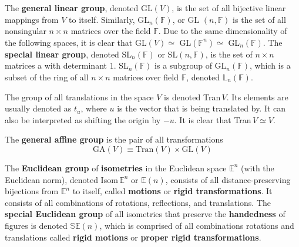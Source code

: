 \documentclass{article}
\begin{document}
  \begin{definition}
    The \textbf{general linear group}, denoted GL$(V)$, is the set of all bijective linear mappings from $V$ to itself. Similarly, GL$_{n}(\mathbb{F})$, or GL $(n, \mathbb{F})$ is the set of all nonsingular $n \times n$ matrices over the field $\mathbb{F}$. Due to the same dimensionality of the following spaces, it is clear that GL$(V) \simeq$ GL$(\mathbb{F}^{n}) \simeq$ GL$_{n}(\mathbb{F})$. The \textbf{special linear group}, denoted SL$_{n} (\mathbb{F})$ or SL$(n, \mathbb{F})$, is the set of $n\times n$ matrices a with determinant $1$. SL$_{n}(\mathbb{F})$ is a subgroup of GL$_{n}(\mathbb{F})$, which is a subset of the ring of all $n \times n$ matrices over field $\mathbb{F}$, denoted $\mathbb{L}_{n}(\mathbb{F})$. 
  \end{definition}

  \begin{definition}
    The group of all translations in the space $V$ is denoted Tran$\,V$. Its elements are usually denoted as $t_{u}$, where $u$ is the vector that is being translated by. It can also be interpreted as shifting the origin by $-u$. It is clear that Tran$\,V \simeq V$. 
  \end{definition}

  \begin{definition}
    The \textbf{general affine group} is the pair of all transformations
    \begin{equation}
      \text{GA} (V) \equiv \text{Tran}(V) \times \text{GL}(V)
    \end{equation}
  \end{definition}

  \begin{definition}[Isometries]
    The \textbf{Euclidean group} of \textbf{isometries} in the Euclidean space $\mathbb{E}^{n}$ (with the Euclidean norm), denoted Isom$\, \mathbb{E}^{n}$ or $\mathbb{E}(n)$, consists of all distance-preserving bijections from $\mathbb{E}^{n}$ to itself, called \textbf{motions} or \textbf{rigid transformations}. It consists of all combinations of rotations, reflections, and translations. The \textbf{special Euclidean group} of all isometries that preserve the \textbf{handedness} of figures is denoted $\mathbb{SE}(n)$, which is comprised of all combinations rotations and translations called \textbf{rigid motions} or \textbf{proper rigid transformations}.
  \end{definition}
\end{document}
